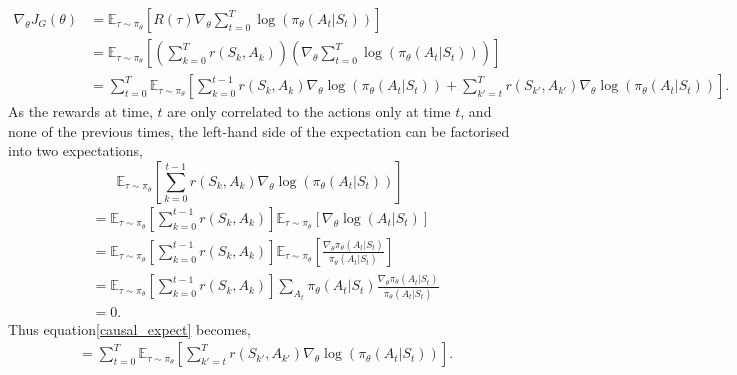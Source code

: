 \begin{align}
	\nabla_{\theta} J_G(\theta) & = \mathbb{E}_{\tau \sim \pi_{\theta}} \left[ R(\tau) \nabla_\theta \sum_{t=0}^ T \log(\pi_\theta(A_t|S_t))\right]                                                                                                                                  \\
	                            & = \mathbb{E}_{\tau \sim \pi_{\theta}} \left[ \left(\sum_{k = 0}^T r(S_k, A_k)\right) \left(\nabla_\theta \sum_{t=0}^ T \log(\pi_\theta(A_t|S_t))\right) \right]                                                                                    \\
	                            & = \sum_{t = 0} ^T \mathbb{E}_{\tau \sim \pi_\theta} \left[ \sum_{k = 0} ^ {t-1} r(S_k, A_k) \nabla_\theta \log(\pi_\theta(A_t|S_t)) + \sum_{k' = t} ^ T r(S_{k'}, A_{k'}) \nabla_\theta \log(\pi_\theta(A_t| S_t)) \right ]. \label{causal_expect}
\end{align}
As the rewards at time, $t$ are only correlated to the actions only at time $t$, and none of the previous times, the left-hand side of the expectation can be factorised into two expectations,
\begin{equation}
	\mathbb{E}_{\tau \sim \pi_\theta} \left[ \sum_{k = 0} ^ {t-1} r(S_k, A_k) \nabla_\theta \log(\pi_\theta(A_t|S_t))\right]
\end{equation}
\begin{align*}
	 & = \mathbb{E}_{\tau \sim \pi_\theta} \left[ \sum_{k=0}^{t-1}r(S_k, A_k)\right] \mathbb{E}_{\tau \sim \pi_\theta} \left[ \nabla_\theta \log(A_t| S_t) \right]                                                                 \\
	 & = \mathbb{E}_{\tau \sim \pi_\theta} \left[ \sum_{k=0}^{t-1}r(S_k, A_k)\right] \mathbb{E}_{\tau \sim \pi_\theta} \left[ \frac{\nabla_\theta \pi_\theta(A_t| S_t)}{\pi_\theta(A_t| S_t)} \right] \label{score_function_lemma} \\
	 & = \mathbb{E}_{\tau \sim \pi_\theta} \left[ \sum_{k=0}^{t-1}r(S_k, A_k)\right] \sum_{A_t} \pi_\theta(A_t|S_t)\frac{\nabla_\theta \pi_\theta(A_t| S_t)}{\pi_\theta(A_t| S_t)}                                                 \\
	 & = 0.
\end{align*}
Thus equation\ref{causal_expect} becomes,
\begin{align}
	 & = \sum_{t = 0} ^T \mathbb{E}_{\tau \sim \pi_\theta} \left [  \sum_{k' = t} ^T  r(S_{k'}, A_{k'}) \nabla_\theta \log(\pi_\theta(A_t| S_t)) \right ].
\end{align}

